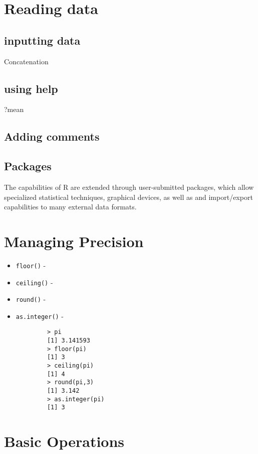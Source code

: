 \documentclass[a4paper,12pt]{article}
\begin{document}
\begin{itemize}
		\section{Reading data}
		
		
		\subsection{inputting data}
		Concatenation
		
		\subsection{using help}
		
		?mean
		
		\subsection{Adding comments}
		
		\subsection{Packages}
		The capabilities of R are extended through user-submitted packages, which allow specialized statistical techniques, graphical devices, as well as and
		import/export capabilities to many external data formats.
		
		\section{Managing Precision}
		\begin{itemize}
			\item \texttt{floor()} - 
			\item \texttt{ceiling()} - 
			\item \texttt{round()} - 
			\item \texttt{as.integer()} -
		\end{itemize}
		
		\begin{framed}
			\begin{verbatim}
			> pi
			[1] 3.141593
			> floor(pi)
			[1] 3
			> ceiling(pi)
			[1] 4
			> round(pi,3)
			[1] 3.142
			> as.integer(pi)
			[1] 3
			\end{verbatim}
		\end{framed}
		
		\section{Basic Operations}

\end{itemize}
\end{document}
